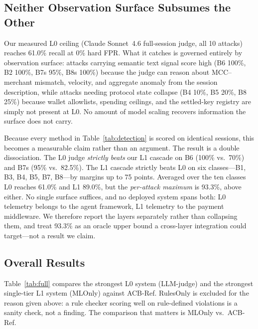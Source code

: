 \documentclass{article}
\begin{document}
\subsection{Neither Observation Surface Subsumes the Other}

Our measured L0 ceiling (Claude Sonnet~4.6 full-session judge, all 10 attacks) reaches 61.0\%
recall at 0\% hard FPR. What it catches is governed entirely by observation surface: attacks
carrying semantic text signal score high (B6 100\%, B2 100\%, B7s 95\%, B8s 100\%) because the
judge can reason about MCC--merchant mismatch, velocity, and aggregate anomaly from the session
description, while attacks needing protocol state collapse (B4 10\%, B5 20\%, B8 25\%) because
wallet allowlists, spending ceilings, and the settled-key registry are simply not present at
L0. No amount of model scaling recovers information the surface does not carry.

Because every method in Table~\ref{tab:detection} is scored on identical sessions, this
becomes a measurable claim rather than an argument. The result is a double dissociation. The
L0 judge \emph{strictly beats} our L1 cascade on B6 (100\% vs.\ 70\%) and B7s (95\% vs.\
82.5\%). The L1 cascade strictly beats L0 on six classes---B1, B3, B4, B5, B7, B8---by margins
up to 75 points. Averaged over the ten classes L0 reaches 61.0\% and L1 89.0\%, but the
\emph{per-attack maximum} is 93.3\%, above either. No single surface suffices, and no deployed
system spans both: L0 telemetry belongs to the agent framework, L1 telemetry to the payment
middleware. We therefore report the layers separately rather than collapsing them, and treat
93.3\% as an oracle upper bound a cross-layer integration could target---not a result we claim.

\subsection{Overall Results}

Table~\ref{tab:full} compares the strongest L0 system (LLM-judge) and the strongest
single-tier L1 system (MLOnly) against ACB-Ref. RulesOnly is excluded for the reason given
above: a rule checker scoring well on rule-defined violations is a sanity check, not a
finding. The comparison that matters is MLOnly vs.\ ACB-Ref.
\end{document}
